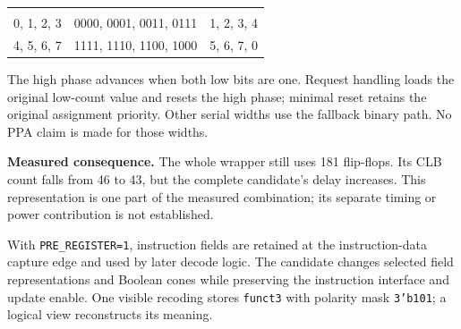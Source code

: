 {\small{}
\begin{tabularx}{\textwidth}{@{}P{31mm}Y P{39mm}@{}}
 &  &  \\
0, 1, 2, 3 & 0000, 0001, 0011, 0111 & 1, 2, 3, 4 \\
4, 5, 6, 7 & 1111, 1110, 1100, 1000 & 5, 6, 7, 0 \\
\end{tabularx}
}
\par
The high phase advances when both low bits are one. Request handling loads the original low-count value and resets the high phase; minimal reset retains the original assignment priority. Other serial widths use the fallback binary path. No PPA claim is made for those widths.

\begin{claimbox}\textbf{Measured consequence.} The whole wrapper still uses 181 flip-flops. Its CLB count falls from 46 to 43, but the complete candidate's delay increases. This representation is one part of the measured combination; its separate timing or power contribution is not established.\end{claimbox}

With \texttt{PRE\_REGISTER=1}, instruction fields are retained at the instruction-data capture edge and used by later decode logic. The candidate changes selected field representations and Boolean cones while preserving the instruction interface and update enable. One visible recoding stores \texttt{funct3} with polarity mask \texttt{3'b101}; a logical view reconstructs its meaning.

\begin{center}\end{center}

